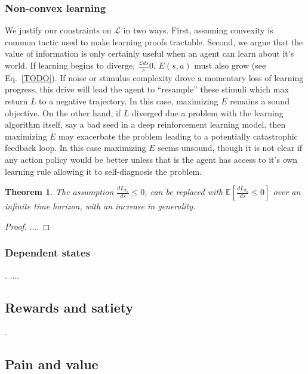 \documentclass[9pt,twocolumn,twoside]{pnas-new}
\newtheorem{theorem}{Theorem}
\begin{document}
\subsubsection{Non-convex learning}
We justify our constraints on $\mathcal{L}$ in two ways. First, assuming convexity is common tactic used to make learning proofs tractable. Second, we argue that the value of information is only certainly useful when an agent can learn about it's world. If learning begins to diverge, $\frac{\mathcal{L}{ds}} > 0$, $E(s, a)$ must also grow (see Eq.~\ref{TODO}). If noise or stimulus complexity drove a momentary loss of learning progress, this drive will lead the agent to ``resample'' these stimuli which max return $L$ to a negative trajectory. In this case, maximizing $E$ remains a sound objective. On the other hand, if $L$ diverged due a problem with the learning algorithm itself, say a bad seed in a deep reinforcement learning model, then maximizing $E$ may exacerbate the problem leading to a potentially catastrophic feedback loop. In this case maximizing $E$ seems unsound, though it is not clear if any action policy would be better unless that is the agent has access to it's own learning rule allowing it to self-diagnosis the problem.

\begin{theorem}
    The assumption $\frac{dL_{\pi_{a}}}{ds} \leq 0$, can be replaced with $\mathbb{E} [\frac{dL_{\pi_{a}}}{ds} \leq 0]$ over an infinite time horizon, with an increase in generality.
\end{theorem}
\begin{proof}
....
\end{proof}


\subsubsection*{Dependent states}.
....


\subsection*{Rewards and satiety}.

\subsection{Pain and value}
\end{document}
